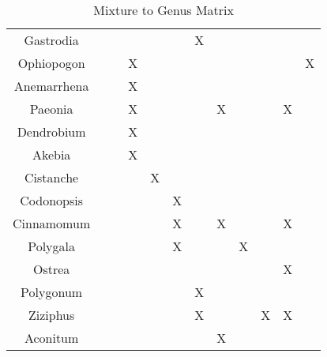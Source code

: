 \documentclass[twocolumn]{article}
\begin{document}
\begin{table*}[htp]
\begin{tabular}{||c c c c c c c c c c c c||}
 Gastrodia      &     &     &     &      &     & X  &     &     &      &      &     \\
 Ophiopogon     &     &     &  X  &      &     &    &     &     &      &      &  X  \\
 Anemarrhena    &     &     &  X  &      &     &    &     &     &      &      &     \\
 Paeonia        &     &     &  X  &      &     &    &  X  &     &      &  X   &     \\
 Dendrobium     &     &     &  X  &      &     &    &     &     &      &      &     \\
 Akebia         &     &     &  X  &      &     &    &     &     &      &      &     \\
 Cistanche      &     &     &     &   X  &     &    &     &     &      &      &     \\
 Codonopsis     &     &     &     &      &  X  &    &     &     &      &      &     \\
 Cinnamomum     &     &     &     &      &  X  &    &  X  &     &      &   X  &     \\
 Polygala       &     &     &     &      &  X  &    &     &  X  &      &      &     \\

 Ostrea         &     &     &     &      &     &    &     &     &      &   X  &     \\
 Polygonum      &     &     &     &      &     & X  &     &     &      &      &     \\
 Ziziphus       &     &     &     &      &     & X  &     &     &  X   &   X  &     \\






 Aconitum       &     &     &     &      &     &    &  X  &     &      &      &     \\


 \hline
\end{tabular}
\caption{Mixture to Genus Matrix}
\label{table:mixtures}
\end{table*}
\end{document}
